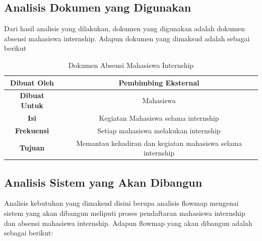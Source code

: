 \subsection{Analisis Dokumen yang Digunakan}
Dari hasil analisis yang dilakukan, dokumen yang digunakan adalah dokumen absensi mahasiswa internship. Adapun dokumen yang dimaksud adalah sebagai berikut
\begin{table}[h!]
\centering
\begin{tabular}{|c|c|} 
 \hline
 \textbf{Dibuat Oleh}   & Pembimbing Eksternal \\ 
\hline
\textbf{Dibuat Untuk}   & Mahasiswa\\ 
\hline
\textbf{Isi}  & Kegiatan Mahasiswa selama internship\\ 
\hline
\textbf{Frekuensi} & Setiap mahasiswa melakukan internship\\ 
\hline
 \textbf{Tujuan }& Memantau kehadiran dan kegiatan mahasiswa selama internship \\ 
 \hline
\end{tabular}
\caption{Dokumen Absensi Mahasiswa Internship}
\label{table:1}
\end{table}

\subsection{Analisis Sistem yang Akan Dibangun}
Analisis kebutuhan yang dimaksud disini berupa analisis flowmap mengenai sistem yang akan dibangun meliputi proses pendaftaran mahasiswa internship dan absensi mahasiswa internship. Adapun flowmap yang akan dibangun adalah sebagai berikut:
